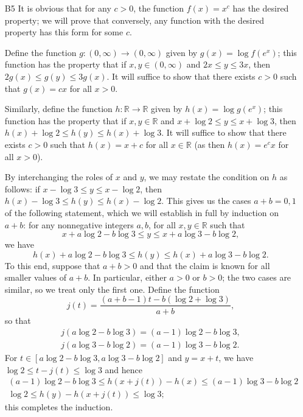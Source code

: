 \documentclass[amssymb,twocolumn,pra,10pt,aps]{revtex4-1}
\newcommand{\RR}{\mathbb{R}}
\begin{document}
\begin{itemize}
\item[B5]
It is obvious that for any $c>0$, the function $f(x) = x^c$ has the desired property; we will prove that conversely, any function with the desired property has this form for some $c$.

Define the function $g: (0, \infty) \to (0, \infty)$ given by
$g(x) = \log f(e^x)$; this function has the property that if $x,y \in (0, \infty)$
and $2x \leq y \leq 3x$, then $2g(x) \leq g(y) \leq 3g(x)$. 
It will suffice to show that there exists $c>0$ such that $g(x) = cx$ for all $x >0$.

Similarly, define the function $h: \RR \to \RR$ given by
$h(x) = \log g(e^x)$; this function has the property that if $x,y \in \RR$
and $x + \log 2 \leq y \leq x + \log 3$, then $h(x) + \log 2 \leq h(y) \leq h(x) + \log 3$. 
It will suffice to show that there exists $c>0$ such that $h(x) = x + c$ for all $x \in \RR$
(as then $h(x) = e^c x$ for all $x>0$).

By interchanging the roles of $x$ and $y$, we may restate the condition on $h$ as follows:
if $x - \log 3 \leq y \leq x - \log 2$, then $h(x) - \log 3 \leq h(y) \leq h(x) - \log 2$. 
This gives us the cases $a+b=0,1$ of the following statement, which we will establish in full by induction on $a+b$: for any nonnegative integers $a,b$, for all $x,y \in \RR$ such that
\[
x + a \log 2 - b \log 3 \leq y \leq x + a \log 3 - b \log 2,
\]
we have
\[
h(x) + a \log 2 - b \log 3 \leq h(y) \leq h(x) + a \log 3 - b \log 2.
\]
To this end, suppose that $a+b>0$ and that the claim is known for all smaller values of $a+b$. In particular, either $a>0$ or $b>0$; the two cases are similar, so we treat only the first one. Define the function
\[
j(t) = \frac{(a+b-1)t - b(\log 2 + \log 3)}{a+b},
\]
so that
\begin{gather*}
j(a \log 2 - b \log 3) = (a-1) \log 2 - b \log 3, \\
j(a \log 3 - b \log 2) = (a-1) \log 3 - b \log 2.
\end{gather*}
For $t \in [a \log 2 - b \log 3, a \log 3 - b \log 2]$ and $y = x+t$,
we have $\log 2 \leq t-j(t) \leq \log 3$ and hence
\begin{gather*}
(a-1) \log 2 - b \log 3 \leq h(x+j(t)) - h(x) \leq (a-1) \log 3 - b \log 2 \\
\log 2 \leq h(y)-h(x+j(t)) \leq \log 3; 
\end{gather*}
this completes the induction.


\end{itemize}
\end{document}
